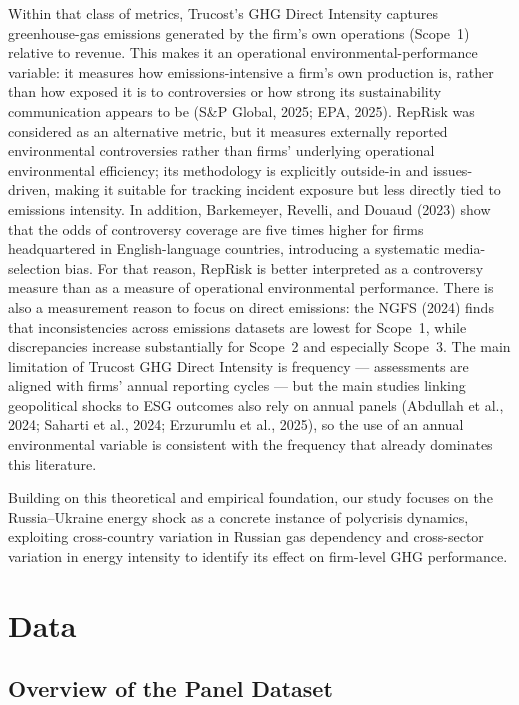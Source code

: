 \documentclass[authoryear,preprint,review,12pt]{elsarticle}
\begin{document}
Within that class of metrics, Trucost's GHG Direct Intensity captures greenhouse-gas emissions generated by the firm's own operations (Scope~1) relative to revenue. This makes it an operational environmental-performance variable: it measures how emissions-intensive a firm's own production is, rather than how exposed it is to controversies or how strong its sustainability communication appears to be (S\&P Global, 2025; EPA, 2025). RepRisk was considered as an alternative metric, but it measures externally reported environmental controversies rather than firms' underlying operational environmental efficiency; its methodology is explicitly outside-in and issues-driven, making it suitable for tracking incident exposure but less directly tied to emissions intensity. In addition, Barkemeyer, Revelli, and Douaud (2023) show that the odds of controversy coverage are five times higher for firms headquartered in English-language countries, introducing a systematic media-selection bias. For that reason, RepRisk is better interpreted as a controversy measure than as a measure of operational environmental performance. There is also a measurement reason to focus on direct emissions: the NGFS (2024) finds that inconsistencies across emissions datasets are lowest for Scope~1, while discrepancies increase substantially for Scope~2 and especially Scope~3. The main limitation of Trucost GHG Direct Intensity is frequency --- assessments are aligned with firms' annual reporting cycles --- but the main studies linking geopolitical shocks to ESG outcomes also rely on annual panels (Abdullah et al., 2024; Saharti et al., 2024; Erzurumlu et al., 2025), so the use of an annual environmental variable is consistent with the frequency that already dominates this literature.

Building on this theoretical and empirical foundation, our study focuses on the Russia--Ukraine energy shock as a concrete instance of polycrisis dynamics, exploiting cross-country variation in Russian gas dependency and cross-sector variation in energy intensity to identify its effect on firm-level GHG performance.


\section{Data}
\label{sec:data}

\subsection{Overview of the Panel Dataset}
\end{document}

